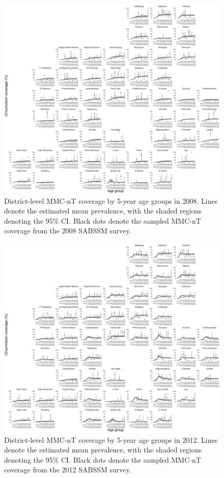 \documentclass{article}
\begin{document}
\begin{appendix}
\begin{figure}[H]
	\centering
	\includegraphics[width = \linewidth]{Figures/suppmat/ModelFit/MMCnTPrev_5year_District_2008_withsurveypoints}
	\caption{District-level MMC-nT coverage by 5-year age groups in 2008. Lines denote the estimated mean prevalence, with the shaded regions denoting the 95\% CI. Black dots denote the sampled MMC-nT coverage from the 2008 SABSSM survey.}
\end{figure}


\begin{figure}[H]
	\centering
	\includegraphics[width = \linewidth]{Figures/suppmat/ModelFit/MMCnTPrev_5year_District_2012_withsurveypoints}
	\caption{District-level MMC-nT coverage by 5-year age groups in 2012. Lines denote the estimated mean prevalence, with the shaded regions denoting the 95\% CI. Black dots denote the sampled MMC-nT coverage from the 2012 SABSSM survey.}
\end{figure}


\end{appendix}
\end{document}

